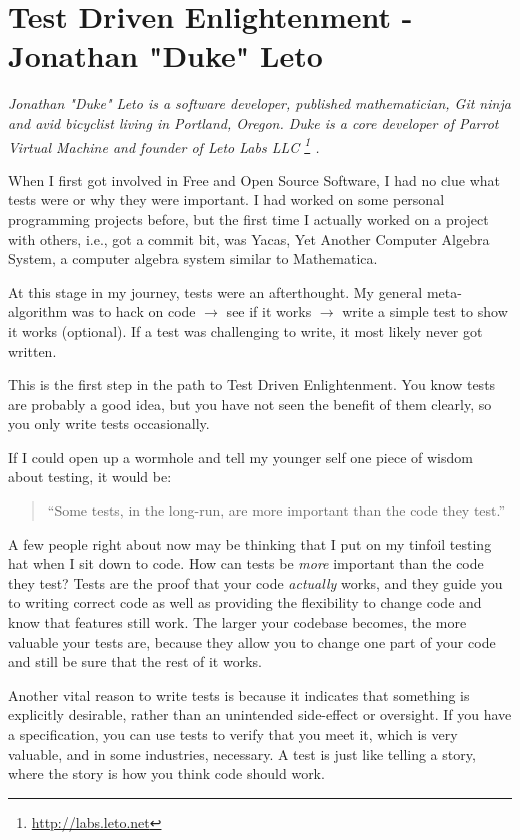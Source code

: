 \chapter{Test Driven Enlightenment - Jonathan "Duke" Leto}

\textit{ Jonathan "Duke" Leto is a software developer, published mathematician,
Git ninja and avid bicyclist living in Portland, Oregon. Duke is a core
developer of Parrot Virtual Machine and founder of Leto Labs LLC \footnote{\url{http://labs.leto.net}} .
}

When I first got involved in Free and Open Source Software, I had no clue what
tests were or why they were important. I had worked on some personal programming
projects before, but the first time I actually worked on a project with others,
i.e., got a commit bit, was Yacas, Yet Another Computer Algebra System, a computer algebra system similar to Mathematica.

At this stage in my journey, tests were an afterthought. My general
meta-algorithm was to hack on code $\rightarrow$ see if it works $\rightarrow$
write a simple test to show it works (optional). If a test was challenging to
write, it most likely never got written.

This is the first step in the path to Test Driven Enlightenment. You know tests
are probably a good idea, but you have not seen the benefit of them clearly, so
you only write tests occasionally.

If I could open up a wormhole and tell my younger self one piece of wisdom about
testing, it would be:
\begin{quote}``Some tests, in the long-run, are more important than the code
they test.''\end{quote}

A few people right about now may be thinking that I put on my tinfoil testing
hat when I sit down to code. How can tests be \emph{more} important than the
code they test? Tests are the proof that your code \emph{actually} works, and
they guide you to writing correct code as well as providing the flexibility to
change code and know that features still work. The larger your codebase becomes,
the more valuable your tests are, because they allow you to change one part of
your code and still be sure that the rest of it works.

Another vital reason to write tests is because it indicates that something is
explicitly desirable, rather than an unintended side-effect or oversight. If you
have a specification, you can use tests to verify that you meet it, which is
very valuable, and in some industries, necessary. A test is just like telling a
story, where the story is how you think code should work.

